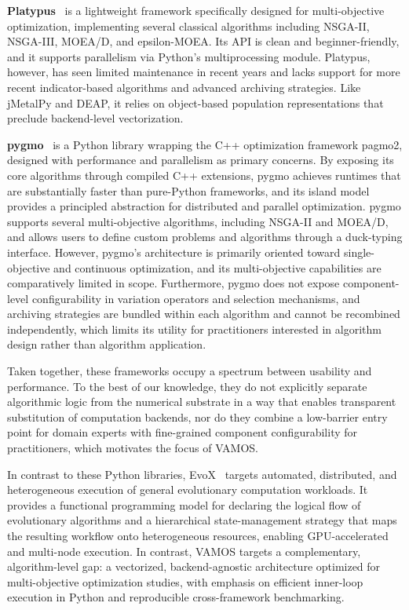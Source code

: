 \documentclass[journal]{IEEEtran}
\newcommand{\VAMOS}{VAMOS}
\begin{document}
\textbf{Platypus}~\cite{hadka15} is a lightweight framework specifically designed for multi-objective optimization, implementing several classical algorithms including NSGA-II, NSGA-III, MOEA/D, and epsilon-MOEA. Its API is clean and beginner-friendly, and it supports parallelism via Python's multiprocessing module. Platypus, however, has seen limited maintenance in recent years and lacks support for more recent indicator-based algorithms and advanced archiving strategies. Like jMetalPy and DEAP, it relies on object-based population representations that preclude backend-level vectorization.

\textbf{pygmo}~\cite{BI20} is a Python library wrapping the C++ optimization framework pagmo2, designed with performance and parallelism as primary concerns. By exposing its core algorithms through compiled C++ extensions, pygmo achieves runtimes that are substantially faster than pure-Python frameworks, and its island model provides a principled abstraction for distributed and parallel optimization. pygmo supports several multi-objective algorithms, including NSGA-II and MOEA/D, and allows users to define custom problems and algorithms through a duck-typing interface. However, pygmo's architecture is primarily oriented toward single-objective and continuous optimization, and its multi-objective capabilities are comparatively limited in scope. Furthermore, pygmo does not expose component-level configurability in variation operators and selection mechanisms, and archiving strategies are bundled within each algorithm and cannot be recombined independently, which limits its utility for practitioners interested in algorithm design rather than algorithm application.


Taken together, these frameworks occupy a spectrum between usability and performance. To the best of our knowledge, they do not explicitly separate algorithmic logic from the numerical substrate in a way that enables transparent substitution of computation backends, nor do they combine a low-barrier entry point for domain experts with fine-grained component configurability for practitioners, which motivates the focus of \VAMOS{}.

In contrast to these Python libraries, EvoX~\cite{HCL+25} targets automated, distributed, and heterogeneous execution of general evolutionary computation workloads. It provides a functional programming model for declaring the logical flow of evolutionary algorithms and a hierarchical state-management strategy that maps the resulting workflow onto heterogeneous resources, enabling GPU-accelerated and multi-node execution. In contrast, \VAMOS{} targets a complementary, algorithm-level gap: a vectorized, backend-agnostic architecture optimized for multi-objective optimization studies, with emphasis on efficient inner-loop execution in Python and reproducible cross-framework benchmarking.
\end{document}
